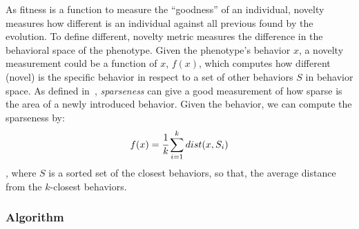 As fitness is a function to measure the ``goodness'' of an individual, novelty measures how different is an individual against all previous found by the evolution. To define different, novelty metric measures the difference in the behavioral space of the phenotype. Given the phenotype's behavior $x$, a novelty measurement could be a function of $x$, $f(x)$, which computes how different (novel) is the specific behavior in respect to a set of other behaviors $S$ in behavior space.  As defined in~\cite{lehman2008exploiting,lehman2011abandoning}, \emph{sparseness} can give a good measurement of how sparse is the area of a newly introduced behavior. Given the behavior, we can compute the sparseness by:
\begin{equation}
\label{sparsenessEquation}
f(x) = \cfrac{1}{k} \sum_{i=1}^{k} dist(x, S_i)
\end{equation}
, where $S$ is a sorted set of the closest behaviors, so that, the average distance from the $k$-closest behaviors.


\subsubsection*{Algorithm}

